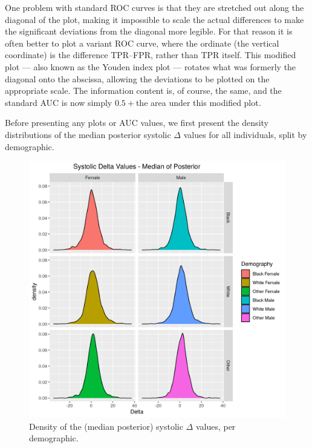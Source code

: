 \documentclass[
]{article}
\begin{document}
One problem with standard ROC curves is that they are stretched out along the diagonal of the plot, making it impossible to scale the actual differences to make the significant deviations from the diagonal more legible.
For that reason it is often better to plot a variant ROC curve, where the ordinate (the vertical coordinate) is the difference TPR--FPR, rather than TPR itself.
This modified plot --- also known as the Youden index plot --- rotates what was formerly the diagonal onto the abscissa, allowing the deviations to be plotted on the appropriate scale.
The information content is, of course, the same, and the standard AUC is now simply \(0.5+\)the area under this modified plot.

Before presenting any plots or AUC values, we first present the density distributions of the median posterior systolic \(\Delta\) values for all individuals, split by demographic.

\begin{figure}
\centering
\includegraphics{./Rmarkdown_Plots/SysDelta_Densities_Demography.png}
\caption{Density of the (median posterior) systolic \(\Delta\) values, per demographic.}\label{fig:DeltaDens}
\end{figure}
\end{document}
